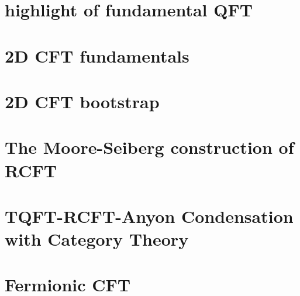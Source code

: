\documentclass[11pt]{report}
\begin{document}
\title{}   
\author{X. D. H.}

\maketitle
\begin{abstract}
    本文是刘宇的学习共形场论的笔记。其中主要介绍了2D CFT的一些基本概念和推导。以及可能的话会比较系统的介绍一些更加Advanced的内容，比如Moore-Seiberg的data，BCFT，SCFT的内容。
\end{abstract}
\tableofcontents

\newpage
\chapter{highlight of fundamental QFT}


\chapter{2D CFT fundamentals}


\chapter{2D CFT bootstrap}


\chapter{The Moore-Seiberg construction of RCFT}


\chapter{TQFT-RCFT-Anyon Condensation with Category Theory}


\chapter{Fermionic CFT}

\end{document}

